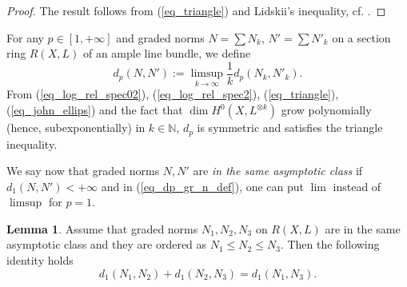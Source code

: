 \documentclass[12pt]{article}
\numberwithin{equation}{section}
\theoremstyle{theorem}
\theoremstyle{definition}
\newtheorem{lem}[thm]{Lemma}
\theoremstyle{remark}
\newcommand{\nat}{\mathbb{N}}
\begin{document}
	\begin{proof}
		The result follows from (\ref{eq_triangle}) and Lidskii’s inequality, cf. \cite[Theorem 5.1]{DarvLuRub}.

	\end{proof}
	\par 
	For any $p \in [1, +\infty]$ and graded norms $N = \sum N_k$, $N' = \sum N'_k$ on a section ring $R(X, L)$ of an ample line bundle, we define
	\begin{equation}\label{eq_dp_gr_n_def}
		d_p(N, N')
		:=
		\limsup_{k \to \infty} \frac{1}{k} d_p(N_k, N'_k).
	\end{equation}
	From (\ref{eq_log_rel_spec02}), (\ref{eq_log_rel_spec2}), (\ref{eq_triangle}), (\ref{eq_john_ellips}) and the fact that $\dim H^0(X, L^{\otimes k})$ grow polynomially (hence, subexponentially) in $k \in \nat$, $d_p$ is symmetric and satisfies the triangle inequality.
	\par 
	We say now that graded norms $N, N'$ are \textit{in the same asymptotic class} if $d_1(N, N') < +\infty$ and in (\ref{eq_dp_gr_n_def}), one can put $\lim$ instead of $\limsup$ for $p = 1$.
	\begin{lem}\label{lem_d_1_ident_metr_gr}
		Assume that graded norms $N_1, N_2, N_3$ on $R(X, L)$ are in the same asymptotic class and they are ordered as $N_1 \leq N_2 \leq N_3$.
		Then the following identity holds
		\begin{equation}\label{eq_d_1_ident_metr_gr}
			d_1(N_1, N_2) + d_1(N_2, N_3) = d_1(N_1, N_3).
		\end{equation}
	\end{lem}
\end{document}
